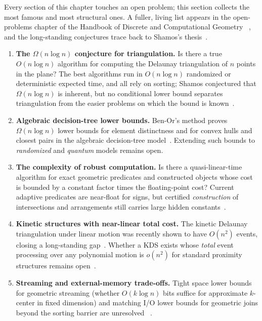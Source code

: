 Every section of this chapter touches an open problem; this section collects
the most famous and most structural ones. A fuller, living list appears in the
open-problems chapter of the Handbook of Discrete and Computational Geometry
~\cite{goodman2017}, and the long-standing conjectures trace back to Shamos's
thesis~\cite{shamos1978}.

\begin{enumerate}
\item \textbf{The $\Omega(n \log n)$ conjecture for triangulation.} Is there a
  true $O(n \log n)$ algorithm for computing the Delaunay triangulation of $n$
  points in the plane? The best algorithms run in $O(n \log n)$ randomized or
  deterministic expected time, and all rely on sorting; Shamos conjectured that
  $\Omega(n \log n)$ is inherent, but no conditional lower bound separates
  triangulation from the easier problems on which the bound is
  known~\cite{shamos1978}.

\item \textbf{Algebraic decision-tree lower bounds.} Ben-Or's method proves
  $\Omega(n \log n)$ lower bounds for element distinctness and for convex hulls
  and closest pairs in the algebraic decision-tree model~\cite{benor1983}.
  Extending such bounds to \emph{randomized} and \emph{quantum} models remains
  open.

\item \textbf{The complexity of robust computation.} Is there a
  quasi-linear-time algorithm for exact geometric predicates and constructed
  objects whose cost is bounded by a constant factor times the floating-point
  cost? Current adaptive predicates are near-float for signs, but certified
  \emph{construction} of intersections and arrangements still carries large
  hidden constants~\cite{yap1997,halperin2004}.

\item \textbf{Kinetic structures with near-linear total cost.} The kinetic
  Delaunay triangulation under linear motion was recently shown to have
  $O(n^2)$ events, closing a long-standing gap~\cite{rubin2016}. Whether a KDS
  exists whose \emph{total} event processing over any polynomial motion is
  $o(n^2)$ for standard proximity structures remains
  open~\cite{guibas1998,agarwal2002kinetic}.

\item \textbf{Streaming and external-memory trade-offs.} Tight space lower
  bounds for geometric streaming (whether $O(k \log n)$ bits suffice for
  approximate $k$-center in fixed dimension) and matching I/O lower bounds for
  geometric joins beyond the sorting barrier are unresolved
  ~\cite{muthukrishnan2005,vitter2001}.


\end{enumerate}
